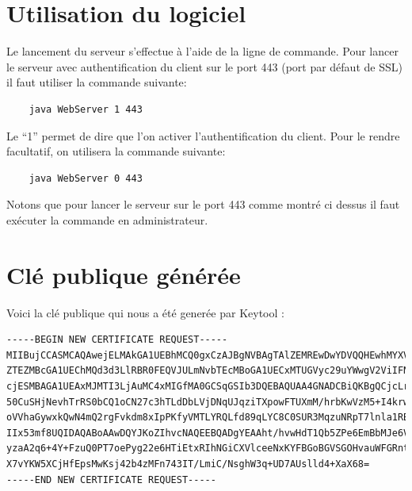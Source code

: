 \documentclass[10pt,a4paper,titlepage]{article}
\begin{document}
\section{Utilisation du logiciel}

Le lancement du serveur s'effectue à l'aide de la ligne de commande. Pour lancer le serveur avec authentification du client sur le port 443 (port par défaut de SSL) il faut utiliser la commande suivante:

\begin{verbatim}
	java WebServer 1 443
\end{verbatim}

Le “1” permet de dire que l'on activer l'authentification du client. Pour le rendre facultatif, on utilisera la commande suivante:

\begin{verbatim}
	java WebServer 0 443
\end{verbatim}

Notons que pour lancer le serveur sur le port 443 comme montré ci dessus il faut exécuter la commande en administrateur. 





\section{Clé publique générée}

Voici la clé publique qui nous a été generée par Keytool :

{\scriptsize
\begin{verbatim}
-----BEGIN NEW CERTIFICATE REQUEST-----
MIIBujCCASMCAQAwejELMAkGA1UEBhMCQ0gxCzAJBgNVBAgTAlZEMREwDwYDVQQHEwhMYXVzYW5u
ZTEZMBcGA1UEChMQd3d3LlRBR0FEQVJULmNvbTEcMBoGA1UECxMTUGVyc29uYWwgV2ViIFNlcnZl
cjESMBAGA1UEAxMJMTI3LjAuMC4xMIGfMA0GCSqGSIb3DQEBAQUAA4GNADCBiQKBgQCjcLrCVl/h
50CuSHjNevhTrRS0bCQ1oCN27c3hTLdDbLVjDNqUJqziTXpowFTUXmM/hrbKwVzM5+I4krwx/6dW
oVVhaGywxkQwN4mQ2rgFvkdm8xIpPKfyVMTLYRQLfd89qLYC8C0SUR3MqzuNRpT7lnla1RB9A6Mg
IIx53mf8UQIDAQABoAAwDQYJKoZIhvcNAQEEBQADgYEAAht/hvwHdT1Qb5ZPe6EmBbMJe6VozqQT
yzaA2q6+4Y+FzuQ0PT7oePyg22e6HTiEtxRIhNGiCXVlceeNxKYFBGoBGVSGOHvauWFGRntErntQ
X7vYKW5XCjHfEpsMwKsj42b4zMFn743IT/LmiC/NsghW3q+UD7AUslld4+XaX68=
-----END NEW CERTIFICATE REQUEST-----
\end{verbatim}
}
\end{document}

